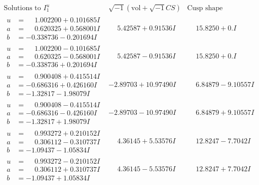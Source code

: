 \documentclass[1p]{elsarticle_modified}
\theoremstyle{definition}
\newcommand{\I}{\sqrt{-1}}
\begin{document}
$$\begin{array}{c|c|c}  
\text{Solutions to }I^u_{1}& \I (\text{vol} + \sqrt{-1}CS) & \text{Cusp shape}\\
 \hline 
\begin{aligned}
u &= \phantom{-}1.002200 + 0.101685 I \\
a &= \phantom{-}0.620325 + 0.568001 I \\
b &= -0.338736 - 0.201694 I\end{aligned}
 & \phantom{-}5.42587 + 0.91536 I & \phantom{-}15.8250 + 0. I\phantom{ +0.000000I} \\ \hline\begin{aligned}
u &= \phantom{-}1.002200 - 0.101685 I \\
a &= \phantom{-}0.620325 - 0.568001 I \\
b &= -0.338736 + 0.201694 I\end{aligned}
 & \phantom{-}5.42587 - 0.91536 I & \phantom{-}15.8250 + 0. I\phantom{ +0.000000I} \\ \hline\begin{aligned}
u &= \phantom{-}0.900408 + 0.415514 I \\
a &= -0.686316 + 0.426160 I \\
b &= -1.32817 - 1.98079 I\end{aligned}
 & -2.89703 + 10.97490 I & \phantom{-}6.84879 - 9.10557 I \\ \hline\begin{aligned}
u &= \phantom{-}0.900408 - 0.415514 I \\
a &= -0.686316 - 0.426160 I \\
b &= -1.32817 + 1.98079 I\end{aligned}
 & -2.89703 - 10.97490 I & \phantom{-}6.84879 + 9.10557 I \\ \hline\begin{aligned}
u &= \phantom{-}0.993272 + 0.210152 I \\
a &= \phantom{-}0.306112 - 0.310737 I \\
b &= -1.09437 - 1.05834 I\end{aligned}
 & \phantom{-}4.36145 + 5.53576 I & \phantom{-}12.8247 - 7.7042 I \\ \hline\begin{aligned}
u &= \phantom{-}0.993272 - 0.210152 I \\
a &= \phantom{-}0.306112 + 0.310737 I \\
b &= -1.09437 + 1.05834 I\end{aligned}
 & \phantom{-}4.36145 - 5.53576 I & \phantom{-}12.8247 + 7.7042 I \\ \hline\begin{aligned}

\end{aligned}
\end{array}$$
\end{document}
